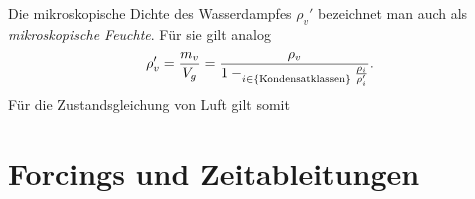 \documentclass{book}
\let\sum\relax
\DeclareMathOperator*{\sum}{\raisebox{-3.5pt}{\scalebox{2}{\rotatebox{1}{{\bask Σ}}}}}
\begin{document}
%
Die mikroskopische Dichte des Wasserdampfes $\rho_v'$ bezeichnet man auch als \textit{mikroskopische Feuchte}. Für sie gilt analog
%
\begin{eqnarray}
\rho_v' = \frac{m_v}{V_g} = \frac{\rho_v}{1 - \sum_{i \in \left\lbrace\text{Kondensatklassen}\right\rbrace}^{}\frac{\rho_i}{\rho_i'}}.
\end{eqnarray}
%
Für die Zustandsgleichung von Luft gilt somit
%
\begin{center}
\end{center}
%
\section{Forcings und Zeitableitungen}
\label{sec:forcings_und_zeitableitungen}
\end{document}
